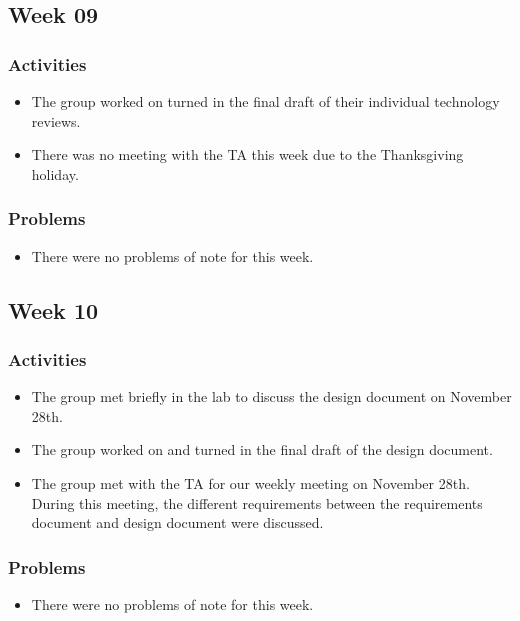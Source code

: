 \documentclass[letterpaper, onecolumn, draftclsnofoot, 10pt, compsoc]{IEEEtran}
\begin{document}
\begin{singlespace}
    \subsection{Week 09}
    	\subsubsection{Activities}
        	\begin{itemize}
        	\item The group worked on turned in the final draft of their individual technology reviews.
            \item There was no meeting with the TA this week due to the Thanksgiving holiday.
        	\end{itemize}
        \subsubsection{Problems}
        	\begin{itemize}
        	\item There were no problems of note for this week.
        	\end{itemize}
        
    \subsection{Week 10}
    	\subsubsection{Activities}
        	\begin{itemize}
            \item The group met briefly in the lab to discuss the design document on November 28th.
        	\item The group worked on and turned in the final draft of the design document.
            \item The group met with the TA for our weekly meeting on November 28th. During this meeting, the different requirements between the requirements document and design document were discussed. 
        	\end{itemize}
        \subsubsection{Problems}
        	\begin{itemize}
        	\item There were no problems of note for this week.
        	\end{itemize}
    

\end{singlespace}
\end{document}
